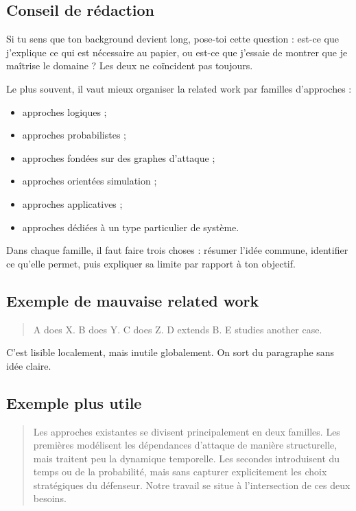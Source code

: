 \documentclass[11pt,a4paper]{article}
\theoremstyle{definition}
\begin{document}
\subsection*{Conseil de rédaction}

Si tu sens que ton background devient long, pose-toi cette question : est-ce que j'explique ce qui est nécessaire au papier, ou est-ce que j'essaie de montrer que je maîtrise le domaine ? Les deux ne coïncident pas toujours.

Le plus souvent, il vaut mieux organiser la related work par familles d'approches :
\begin{itemize}
    \item approches logiques ;
    \item approches probabilistes ;
    \item approches fondées sur des graphes d'attaque ;
    \item approches orientées simulation ;
    \item approches applicatives ;
    \item approches dédiées à un type particulier de système.
\end{itemize}

Dans chaque famille, il faut faire trois choses : résumer l'idée commune, identifier ce qu'elle permet, puis expliquer sa limite par rapport à ton objectif.

\subsection*{Exemple de mauvaise related work}

\begin{quote}
A does X. B does Y. C does Z. D extends B. E studies another case.
\end{quote}

C'est lisible localement, mais inutile globalement. On sort du paragraphe sans idée claire.

\subsection*{Exemple plus utile}

\begin{quote}
Les approches existantes se divisent principalement en deux familles. Les premières modélisent les dépendances d'attaque de manière structurelle, mais traitent peu la dynamique temporelle. Les secondes introduisent du temps ou de la probabilité, mais sans capturer explicitement les choix stratégiques du défenseur. Notre travail se situe à l'intersection de ces deux besoins.
\end{quote}
\end{document}
